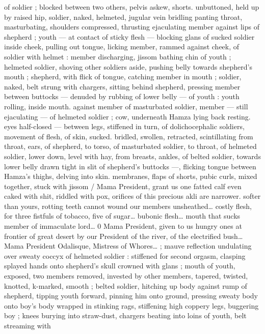 of soldier ; blocked between two others, pelvis askew, shorts. 
unbuttoned, held up by raised hip, soldier, naked, helmeted, jugular 
vein bridling panting throat, masturbating, shoulders compressed, 
thrusting ejaculating member against lips of shepherd ; youth --- at 
contact of sticky flesh --- blocking glans of sucked soldier inside 
cheek, pulling out tongue, licking member, rammed against cheek, of 
soldier with helmet : member discharging, jissom bathing chin of 
youth ; helmeted soldier, shoving other soldiers aside, pushing belly 
towards shepherd's mouth ; shepherd, with flick of tongue, catching 
member in mouth ; soldier, naked, belt strung with chargers, sitting 
behind shepherd, pressing member between buttocks --- denuded 
by rubbing of lower belly --- of youth : youth rolling, inside mouth. 
against member of masturbated soldier, member --- still ejaculating 
--- of helmeted soldier ; cow, underneath Hamza lying back resting. 
eyes half-closed --- between legs, stiffened in turn, of 
dolichocephalic soldiers, movement of flesh, of skin, sucked. 
bridled, swollen, retracted, scintillating from throat, ears, of 
shepherd, to torso, of masturbated soldier, to throat, of helmeted 
soldier, lower down, level with hay, from breasts, ankles, of belted 
soldier, towards lower belly drawn tight in slit of shepherd's buttocks 
---, flicking tongue between Hamza's thighs, delving into skin. 
membranes, flaps of shorts, pubic curls, mixed together, stuck with 
jissom {\slash} {\td} {\gl} Mama President, grant us one fatted calf{\td} even caked 
with shit, riddled with pox, orifices of this precious akli are narrower. 
softer than yours, rotting teeth cannot wound our members 
unsheathed{\ldots} costly flesh, for three fistfuls of tobacco, five of 
sugar{\ldots} bubonic flesh{\ldots} mouth that sucks member of immaculate 
lord{\ldots} 0 Mama President, given to us hungry ones at frontier of great 
desert by our President of the river, of the electrified bush{\ldots} Mama 
President Odalisque, Mistress of Whores{\ldots}{\gr} ; mauve reflection 
undulating over sweaty coccyx of helmeted soldier : stiffened for 
second orgasm, clasping splayed hands onto shepherd's skull 
crowned with glans ; mouth of youth, exposed, two members 
removed, invested by other members, tapered, twisted, knotted, 
k-marked, smooth ; belted soldier, hitching up body against rump 
of shepherd, tipping youth forward, pinning him onto ground, 
pressing sweaty body onto boy's body wrapped in stinking rags, 
stiffening high coppery legs, buggering boy ; knees burying into 
straw-dust, chargers beating into loins of youth, belt streaming with 

